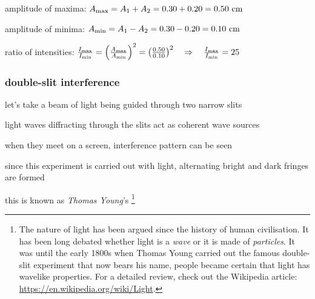 
\sol amplitude of maxima: $A_{\text{max}} = A_1 + A_2 = 0.30 + 0.20 = 0.50 \text{ cm}$

amplitude of minima: $A_{\text{min}} = A_1 - A_2 = 0.30 - 0.20 = 0.10 \text{ cm}$

ratio of intensities: $\frac{I_{\text{max}}}{I_{\text{min}}} = \left( \frac{A_{\text{max}}}{A_{\text{min}}} \right)^2 = \left( \frac{0.50}{0.10} \right)^2 \quad \Rightarrow \quad \frac{I_{\text{max}}}{I_{\text{min}}} = 25$ \eoe
 




\newpage


\subsubsection{double-slit interference}

let's take a beam of light being guided through two narrow slits

light waves diffracting through the slits act as coherent wave sources

when they meet on a screen, interference pattern can be seen

since this experiment is carried out with light, alternating bright and dark fringes are formed

this is known as \emph{Thomas Young}'s 
\footnote{The nature of light has been argued since the history of human civilisation. It has been long debated whether light is a \emph{wave} or it is made of \emph{particles}. It was until the early 1800s when Thomas Young carried out the famous double-slit experiment that now bears his name, people became certain that light has wavelike properties. For a detailed review, check out the Wikipedia article: \url{https://en.wikipedia.org/wiki/Light}.}


